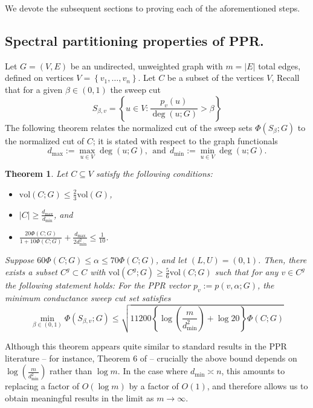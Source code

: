 \documentclass[11pt,twoside]{article}
\newtheorem{theorem}{Theorem}
\newcommand{\set}[1]{\left\{#1\right\}}
\newcommand{\vol}{\mathrm{vol}}
\newcommand{\abs}[1]{\left \lvert #1 \right \rvert}
\newcommand{\1}{\mathbf{1}}
\begin{document}
We devote the subsequent sections to proving each of the aforementioned steps.

\subsection{Spectral partitioning properties of PPR.}

Let $G = (V,E)$ be an undirected, unweighted graph with $m = \abs{E}$ total edges, defined on vertices $V = \set{v_1, \ldots, v_n}$. Let $C$ be a subset of the vertices $V$, Recall that for a given $\beta \in (0,1)$ the sweep cut 
\begin{equation*}
S_{\beta,v} = \set{u \in V: \frac{p_v(u)}{\deg(u;G)} > \beta}
\end{equation*} 
The following theorem relates the normalized cut of the sweep sets $\Phi(S_{\beta};G)$ to the normalized cut of $C$; it is stated with respect to the graph functionals 
\begin{equation*}
d_{\max} := \max_{u \in V} \deg(u;G), ~~\textrm{and}~~ d_{\min} := \min_{u \in V} \deg(u;G).
\end{equation*}
\begin{theorem}
	\label{thm:conductance_ppr}
	Let $C \subseteq V$ satisfy the following conditions:
	\begin{itemize}
		\item $\vol(C;G) \leq \frac{2}{3}\vol(G)$,
		\item $\abs{C} \geq \frac{d_{\max}}{d_{\min}}$, and
		\item $\frac{20\Phi(C;G)}{1 + 10\Phi(C;G)} + \frac{d_{\max}}{2d_{\min}^2} \leq \frac{1}{10}$.
	\end{itemize}
	Suppose $60\Phi(C;G) \leq \alpha \leq 70\Phi(C;G)$, and let $(L,U) = (0,1)$. Then, there exists a subset $C^g \subset C$ with $\vol(C^g;G) \geq \frac{5}{6}\vol(C;G)$ such that for any $v \in C^g$ the following statement holds: For the PPR vector $p_v := p(v,\alpha;G)$, the minimum conductance sweep cut set satisfies 
	\begin{equation*}
	\min_{\beta \in (0,1)}\Phi(S_{\beta,v};G) \leq \sqrt{11200\left\{\log\left(\frac{m}{d_{\min}^2}\right) + \log 20\right\} \Phi(C;G)}
	\end{equation*}
\end{theorem}
Although this theorem appears quite similar to standard results in the PPR literature -- for instance, Theorem 6 of \citet{andersen2006} -- crucially the above bound depends on $\log\left(\frac{m}{d_{\min}^2}\right)$ rather than $\log m$. In the case where $d_{\min} \asymp n$, this amounts to replacing a factor of $O(\log m)$ by a factor of ${O}(1)$, and therefore allows us to obtain meaningful results in the limit as $m \to \infty$. 
\end{document}
